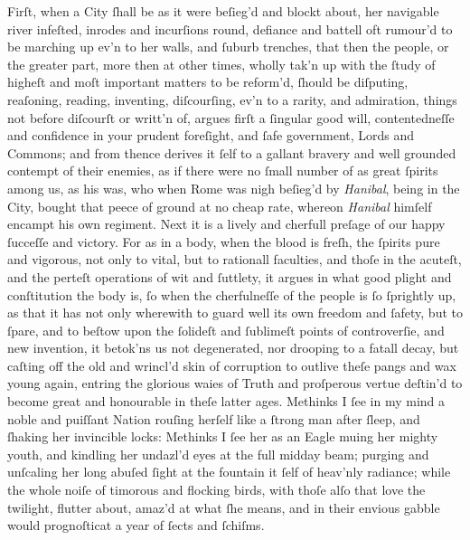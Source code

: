 Firſt, when a City ſhall be as it were beſieg'd and blockt about, her navigable
river infeſted, inrodes and incurſions round, defiance and battell oft rumour'd
to be marching up ev'n to her walls, and ſuburb trenches, that then the people,
or the greater part, more then at other times, wholly tak'n up with the ſtudy of
higheſt and moſt important matters to be reform'd, ſhould be diſputing,
reaſoning, reading, inventing, diſcourſing, ev'n to a rarity, and admiration,
things not before diſcourſt or writt'n of, argues firſt a ſingular good will,
contentedneſſe and confidence in your prudent foreſight, and ſafe government,
Lords and Commons; and from thence derives it ſelf to a gallant bravery and well
grounded contempt of their enemies, as if there were no ſmall number of as great
ſpirits among us, as his was, who when Rome was nigh beſieg'd by
\textit{Hanibal}, being in the City, bought that peece of ground at no cheap
rate, whereon \textit{Hanibal} himſelf encampt his own regiment.  Next it is a
lively and cherfull preſage of our happy ſucceſſe and victory.  For as in a
body, when the blood is freſh, the ſpirits pure and vigorous, not only to vital,
but to rationall faculties, and thoſe in the acuteſt, and the perteſt operations
of wit and ſuttlety, it argues in what good plight and conſtitution the body is,
ſo when the cherfulneſſe of the people is ſo ſprightly up, as that it has not
only wherewith to guard well its own freedom and ſafety, but to ſpare, and to
beſtow upon the ſolideſt and ſublimeſt points of controverſie, and new
invention, it betok'ns us not degenerated, nor drooping to a fatall decay, but
caſting off the old and wrincl'd skin of corruption to outlive theſe pangs and
wax young again, entring the glorious waies of Truth and proſperous vertue
deſtin'd to become great and honourable in theſe latter ages.  Methinks I ſee in
my mind a noble and puiſſant Nation rouſing herſelf like a ſtrong man after
ſleep, and ſhaking her invincible locks: Methinks I ſee her as an Eagle muing
her mighty youth, and kindling her undazl'd eyes at the full midday beam;
purging and unſcaling her long abuſed ſight at the fountain it ſelf of heav'nly
radiance; while the whole noiſe of timorous and flocking birds, with thoſe alſo
that love the twilight, flutter about, amaz'd at what ſhe means, and in their
envious gabble would prognoſticat a year of ſects and ſchiſms.

